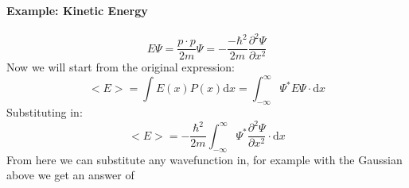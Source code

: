\paragraph{Example: Kinetic Energy}
$$
	E\Psi = \frac{p\cdot p}{2m}\Psi = -\frac{-\hbar^2}{2m}
	\frac{\partial^2 \Psi}{\partial x^2}
$$
Now we will start from the original expression:
$$
	<E> = \int E(x)P(x) \mathrm{d}x = 
	\int^\infty_{-\infty} \Psi^* E \Psi \cdot \mathrm{d}x
$$
Substituting in:
$$
	<E> = -\frac{\hbar^2}{2m}\int^\infty_{-\infty} \Psi^*
	\frac{\partial^2 \Psi}{\partial x^2} \cdot \mathrm{d}x
$$
From here we can substitute any wavefunction in, for example with the Gaussian
above we get an answer of %
